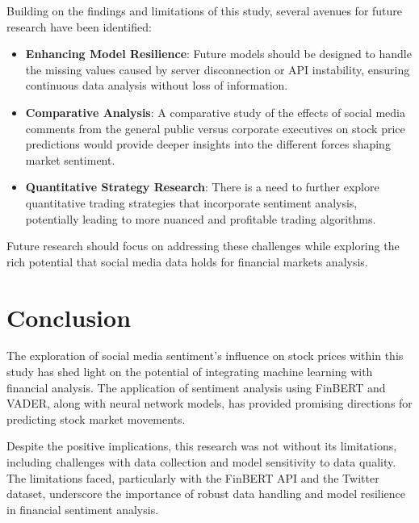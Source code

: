\documentclass[11pt,a4paper]{article}
\begin{document}
  Building on the findings and limitations of this study, several avenues for future research have been identified:
  
  \begin{itemize}
    \item \textbf{Enhancing Model Resilience}: Future models should be designed to handle the missing values caused by server disconnection or API instability, ensuring continuous data analysis without loss of information.
    
    \item \textbf{Comparative Analysis}: A comparative study of the effects of social media comments from the general public versus corporate executives on stock price predictions would provide deeper insights into the different forces shaping market sentiment.
    
    \item \textbf{Quantitative Strategy Research}: There is a need to further explore quantitative trading strategies that incorporate sentiment analysis, potentially leading to more nuanced and profitable trading algorithms.
  \end{itemize}
  
  Future research should focus on addressing these challenges while exploring the rich potential that social media data holds for financial markets analysis.
  









  \section{Conclusion}

  The exploration of social media sentiment's influence on stock prices within this study has shed light on the potential of integrating machine learning with financial analysis. The application of sentiment analysis using FinBERT and VADER, along with neural network models, has provided promising directions for predicting stock market movements.
  
  Despite the positive implications, this research was not without its limitations, including challenges with data collection and model sensitivity to data quality. The limitations faced, particularly with the FinBERT API and the Twitter dataset, underscore the importance of robust data handling and model resilience in financial sentiment analysis.
  
\end{document}
